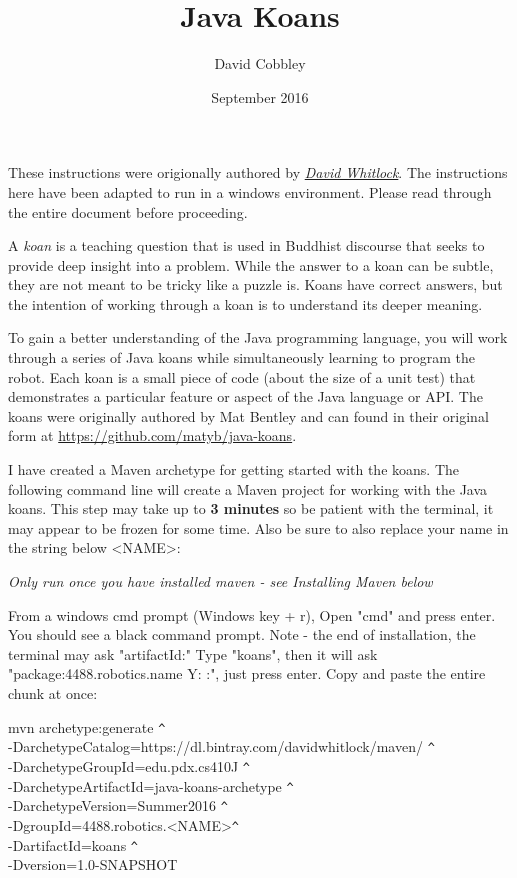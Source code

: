 \documentclass[12pt]{article}
\title{Java Koans}
\author{David Cobbley }
\date{September 2016}
\begin{document}
\maketitle

These instructions were origionally authored by \textit{\href{http://web.cecs.pdx.edu/~whitlock/}{David Whitlock}}. The instructions here have been adapted to run in a windows environment. Please read through the entire document before proceeding.

A \textit{koan} is a teaching question that is used in Buddhist discourse that seeks to provide deep insight into a problem. While the answer to a koan can be subtle, they are not meant to be tricky like a puzzle is. Koans have correct answers, but the intention of working through a koan is to understand its deeper meaning.

To gain a better understanding of the Java programming language, you will work through a series of Java koans while simultaneously learning to program the robot. Each koan is a small piece of code (about the size of a unit test) that demonstrates a particular feature or aspect of the Java language or API. The koans were originally authored by Mat Bentley and can found in their original form at \url{https://github.com/matyb/java-koans}.

I have created a Maven archetype for getting started with the koans. The following command line will create a Maven project for working with the Java koans. This step may take up to \textbf{3 minutes} so be patient with the terminal, it may appear to be frozen for some time. Also be sure to also replace your name in the string below \textless NAME\textgreater:

\textit{Only run once you have installed maven - see Installing Maven below}

From a windows cmd prompt (Windows key + r), Open "cmd" and press enter. You should see a black command prompt. Note - the end of installation, the terminal may ask "artifactId:" Type "koans", then it will ask "package:4488.robotics.name Y: :", just press enter. Copy and paste the entire chunk at once:

\hspace{2mm} mvn archetype:generate \verb|^|\\
\hspace{2mm} -DarchetypeCatalog=https://dl.bintray.com/davidwhitlock/maven/ \verb|^|\\
\hspace{2mm} -DarchetypeGroupId=edu.pdx.cs410J \verb|^|\\
\hspace{2mm} -DarchetypeArtifactId=java-koans-archetype \verb|^|\\
\hspace{2mm} -DarchetypeVersion=Summer2016 \verb|^|\\
\hspace{2mm} -DgroupId=4488.robotics.\textless NAME\textgreater \verb|^|\\
\hspace{2mm} -DartifactId=koans \verb|^|\\
\hspace{2mm} -Dversion=1.0-SNAPSHOT
\end{document}
